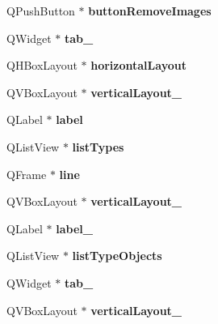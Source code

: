 \begin{DoxyCompactItemize}
Q\+Push\+Button $\ast$ {\bfseries button\+Remove\+Images}
\item 
\mbox{\label{class_ui___main_form_ac12d79b27be03656444bdb00dae7a62f}} 
Q\+Widget $\ast$ {\bfseries tab\+\_}
\item 
\mbox{\label{class_ui___main_form_a553a9967f6be6e9d1e0a0a54fee10daa}} 
Q\+H\+Box\+Layout $\ast$ {\bfseries horizontal\+Layout}
\item 
\mbox{\label{class_ui___main_form_af5f20de128fc30c9fd90d460a85afc59}} 
Q\+V\+Box\+Layout $\ast$ {\bfseries vertical\+Layout\+\_}
\item 
\mbox{\label{class_ui___main_form_a1616edf4b999f5a98c11fd85377abb73}} 
Q\+Label $\ast$ {\bfseries label}
\item 
\mbox{\label{class_ui___main_form_ad3f9fef3e8f7f5f32611c91ecefc383b}} 
Q\+List\+View $\ast$ {\bfseries list\+Types}
\item 
\mbox{\label{class_ui___main_form_afd49fd1bb8c7909456e134150972c9e7}} 
Q\+Frame $\ast$ {\bfseries line}
\item 
\mbox{\label{class_ui___main_form_a84103ec26d0f73ba90bafe93c92b362b}} 
Q\+V\+Box\+Layout $\ast$ {\bfseries vertical\+Layout\+\_}
\item 
\mbox{\label{class_ui___main_form_a8c88102e67d7d9d33264817df98c1b57}} 
Q\+Label $\ast$ {\bfseries label\+\_}
\item 
\mbox{\label{class_ui___main_form_a6a570165a698d3428d24744191260c05}} 
Q\+List\+View $\ast$ {\bfseries list\+Type\+Objects}
\item 
\mbox{\label{class_ui___main_form_a7da55e0a65c440c30cf947e34433186b}} 
Q\+Widget $\ast$ {\bfseries tab\+\_}
\item 
\mbox{\label{class_ui___main_form_a6289a84ef6c86f859e23f80bb25805ef}} 
Q\+V\+Box\+Layout $\ast$ {\bfseries vertical\+Layout\+\_}

\end{DoxyCompactItemize}
